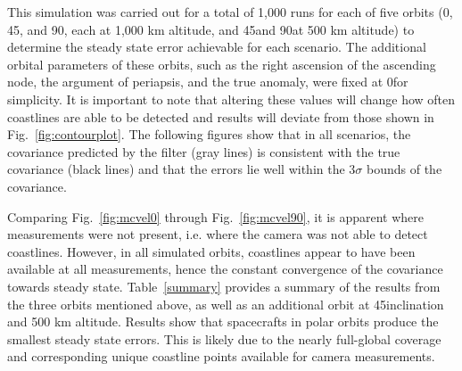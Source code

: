 \documentclass[]{aiaa-tc}%
\begin{document}
This simulation was carried out for a total of 1,000 runs for each of five orbits (0\degree, 45\degree, and 90\degree, each at 1,000 km altitude, and 45\degree and 90\degree at 500 km altitude) to determine the steady state error achievable for each scenario.  The additional orbital parameters of these orbits, such as the right ascension of the ascending node, the argument of periapsis, and the true anomaly, were fixed at 0\degree for simplicity.  It is important to note that altering these values will change how often coastlines are able to be detected and results will deviate from those shown in Fig.~\ref{fig:contourplot}.  The following figures show that in all scenarios, the covariance predicted by the filter (gray lines) is consistent with the true covariance (black lines) and that the errors lie well within the 3$\sigma$ bounds of the covariance. 

Comparing Fig.~\ref{fig:mcvel0} through Fig.~\ref{fig:mcvel90}, it is apparent where measurements were not present, i.e. where the camera was not able to detect coastlines.  However, in all simulated orbits, coastlines appear to have been available at all measurements, hence the constant convergence of the covariance towards steady state.  Table~\ref{summary} provides a summary of the results from the three orbits mentioned above, as well as an additional orbit at 45\degree inclination and 500 km altitude.  Results show that spacecrafts in polar orbits produce the smallest steady state errors.  This is likely due to the nearly full-global coverage and corresponding unique coastline points available for camera measurements.
\end{document}
